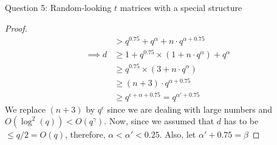 \begin{solution}{Question 5: Random-looking $t$ matrices with a special structure}
\begin{proof}
\begin{equation}
\begin{split}
                           &> q^{0.75} + q^\alpha + n\cdot q^{\alpha + 0.75}\\
                \implies d &\geq 1 + q^{0.75}\times(1 + n\cdot q^\alpha) + q^\alpha\\
                           &\geq q^{0.75}\times(3 + n\cdot q^\alpha)\\
                           &\geq (n + 3)\cdot q^{\alpha + 0.75}\\
                           &\geq q^{\epsilon + \alpha + 0.75} = q^{\alpha' + 0.75}
            \end{split}
        \end{equation}
        We replace $(n + 3)$ by $q^\epsilon$ since we are dealing with large numbers and $O(\log^2(q)) < O(q^\gamma)$. Now, since we assumed that $d$ has to be $\leq q/2 = O(q)$, therefore, $\alpha < \alpha' < 0.25$. Also, let $\alpha' + 0.75 = \beta$\par
    \end{proof}
\end{solution}
